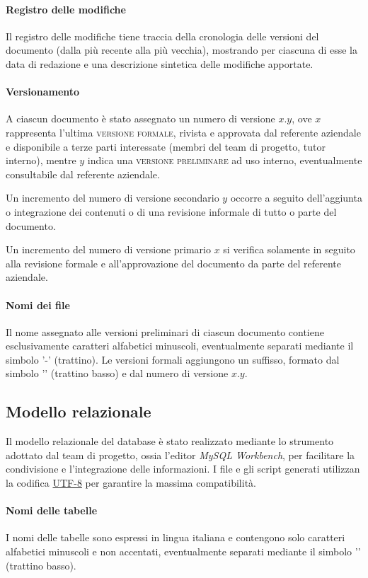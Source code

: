 \paragraph{Registro delle modifiche}
Il registro delle modifiche tiene traccia della cronologia delle versioni del documento (dalla più recente alla più vecchia), mostrando per ciascuna di esse la data di redazione e una descrizione sintetica delle modifiche apportate.

\paragraph{Versionamento}
A ciascun documento è stato assegnato un numero di versione $x.y$, ove $x$ rappresenta l'ultima \textsc{versione formale}, rivista e approvata dal referente aziendale e disponibile a terze parti interessate (membri del team di progetto, tutor interno), mentre $y$ indica una \textsc{versione preliminare} ad uso interno, eventualmente consultabile dal referente aziendale.

Un incremento del numero di versione secondario $y$ occorre a seguito dell'aggiunta o integrazione dei contenuti o di una revisione informale di tutto o parte del documento.

Un incremento del numero di versione primario $x$ si verifica solamente in seguito alla revisione formale e all'approvazione del documento da parte del referente aziendale.

\paragraph{Nomi dei file}
Il nome assegnato alle versioni preliminari di ciascun documento contiene esclusivamente caratteri alfabetici minuscoli, eventualmente separati mediante il simbolo '-' (trattino). Le versioni formali aggiungono un suffisso, formato dal simbolo '\textunderscore' (trattino basso) e dal numero di versione $x.y$.

\subsection{Modello relazionale}
Il modello relazionale del database è stato realizzato mediante lo strumento adottato dal team di progetto, ossia l'editor \textit{MySQL Workbench}, per facilitare la condivisione e l'integrazione delle informazioni. I file e gli script generati utilizzan la codifica \underline{UTF-8} per garantire la massima compatibilità.

\paragraph{Nomi delle tabelle}
I nomi delle tabelle sono espressi in lingua italiana e contengono solo caratteri alfabetici minuscoli e non accentati, eventualmente separati mediante il simbolo '\textunderscore' (trattino basso).

